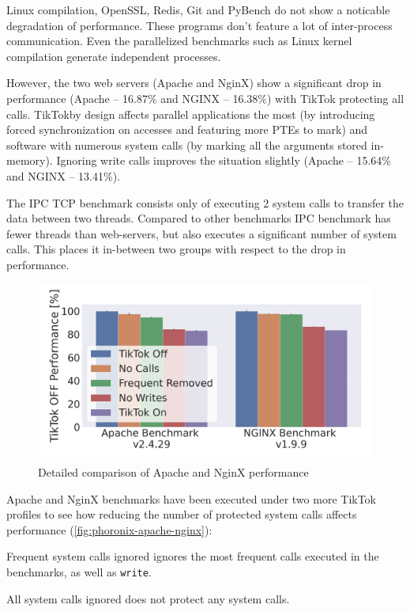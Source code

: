 \documentclass[conference]{IEEEtran}
\newcommand{\sysname}{TikTok}
\begin{document}
Linux compilation, OpenSSL, Redis, Git and PyBench do not show a noticable
degradation of performance. These programs don't feature a lot of inter-process
communication. Even the parallelized benchmarks such as Linux kernel compilation
generate independent processes.

However, the two web servers (Apache and NginX) show a significant drop in
performance (Apache -- 16.87\% and NGINX -- 16.38\%) with \sysname{} protecting
all calls. \sysname by design affects parallel applications the most (by
introducing forced synchronization on accesses and featuring more PTEs to mark)
and software with numerous system calls (by marking all the arguments stored
in-memory). Ignoring write calls improves the situation slightly (Apache --
15.64\% and NGINX -- 13.41\%).

The IPC TCP benchmark consists only of executing 2 system calls to transfer
the data between two threads. Compared to other benchmarks IPC benchmark has fewer
threads than web-servers, but also executes a significant number of system calls.
This places it in-between two groups with respect to the drop in performance.

\begin{figure}[]
  \centering
  \includegraphics[width=\linewidth]{graphs/apache-nginx-5.png}
  \caption{Detailed comparison of Apache and NginX performance}
  \label{fig:phoronix-apache-nginx}
\end{figure}

Apache and NginX benchmarks have been executed under two more \sysname{}
profiles to see how reducing the number of protected system calls affects
performance (\autoref{fig:phoronix-apache-nginx}):

\begin{LaTeXdescription}
  \item[Frequent system calls ignored] ignores the most frequent calls executed in the benchmarks, as well as \texttt{write}.
  \item[All system calls ignored] does not protect any system calls.
\end{LaTeXdescription}
\end{document}
